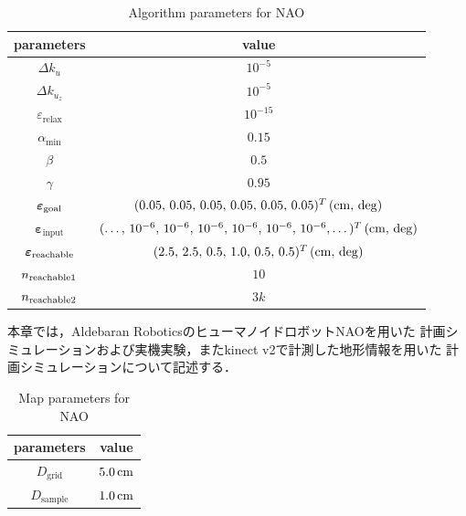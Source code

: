 \documentclass[autodetect-engine,dvipdfmx-if-dvi,ja=standard,a4j,jbase=11pt,magstyle=nomag*]{bxjsreport}
\begin{document}
\begin{table}[pt]%
    \renewcommand{\arraystretch}{1.0}
    \centering
    \caption{Algorithm parameters for NAO}
    \label{tab:sim_nao_param_algorithm}
    \begin{tabular}{cc}
        \toprule
        parameters                          &   value \\
        \midrule
        $\Delta k_u$                        &   $10^{-5}$ \\
        $\Delta k_{u_z}$                    &   $10^{-5}$ \\
        $\varepsilon_\mathrm{relax}$        &   $10^{-15}$ \\
        $\alpha_\mathrm{min}$               &   $0.15$ \\
        $\beta$                             &   $0.5$ \\
        $\gamma$                            &   $0.95$ \\
        $\bm{\varepsilon}_{\mathrm{goal}}$          &   $(0.05 ,\, 0.05 ,\, 0.05 ,\, 0.05 ,\, 0.05 ,\, 0.05)^T\,(\si{\centi\meter} ,\, \mathrm{deg})$ \\
        $\bm{\varepsilon}_{\mathrm{input}}$ &   $(\dots ,\, 10^{-6} ,\, 10^{-6} ,\, 10^{-6} ,\, 10^{-6} ,\, 10^{-6} ,\, 10^{-6} , \dots)^T\,(\si{\centi\meter} ,\, \mathrm{deg})$ \\
        $\bm{\varepsilon}_{\mathrm{reachable}}$     &   $(2.5 ,\, 2.5 ,\, 0.5 ,\, 1.0 ,\, 0.5 ,\, 0.5)^T\,(\si{\centi\meter} ,\, \mathrm{deg})$ \\
        $n_{\mathrm{reachable}1}$                   &   $10$ \\
        $n_{\mathrm{reachable}2}$                   &   $3k$ \\
        \bottomrule
    \end{tabular}
    \vspace{5truemm}
    \renewcommand{\arraystretch}{1.0}
\end{table}

本章では，Aldebaran RoboticsのヒューマノイドロボットNAO\cite{mao_official}を用いた
計画シミュレーションおよび実機実験，またkinect v2\cite{microsoft_kinectv2}で計測した地形情報を用いた
計画シミュレーションについて記述する．


\begin{table}[pt]%
    \centering
    \caption{Map parameters for NAO}
    \label{tab:sim_nao_param_map}
    \begin{tabular}{cc}
        \toprule
        parameters          &   value \\
        \midrule
        $D_\mathrm{grid}$   &   $5.0\,\si{\centi\meter}$ \\
        $D_\mathrm{sample}$ &   $1.0\,\si{\centi\meter}$ \\
        \bottomrule
    \end{tabular}
    \renewcommand{\arraystretch}{1.0}
\end{table}
\end{document}
